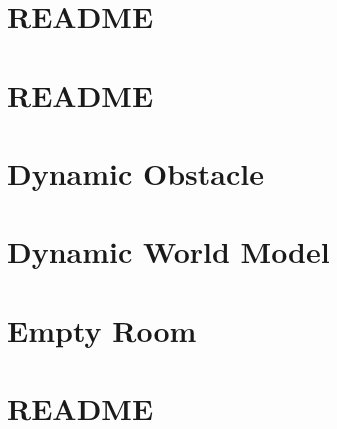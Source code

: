 \let\mypdfximage\pdfximage\def\pdfximage{\immediate\mypdfximage}\documentclass[twoside]{book}
\newcommand{\+}{\discretionary{\mbox{\scriptsize$\hookleftarrow$}}{}{}}
\begin{document}
\chapter{README}
\label{md_smacc2_sm_reference_library_sm_atomic_performance_trace_1_README}

\chapter{README}
\label{md_smacc2_sm_reference_library_sm_atomic_subscribers_performance_test_README}

\chapter{Dynamic Obstacle}
\label{md_smacc2_sm_reference_library_sm_aws_warehouse_navigation_models_dynamic_obstacle_README}

\chapter{Dynamic World Model}
\label{md_smacc2_sm_reference_library_sm_aws_warehouse_navigation_models_dynamic_world_README}

\chapter{Empty Room}
\label{md_smacc2_sm_reference_library_sm_aws_warehouse_navigation_models_empty_room_README}

\chapter{README}
\label{md_smacc2_sm_reference_library_sm_branching_README}

\end{document}
